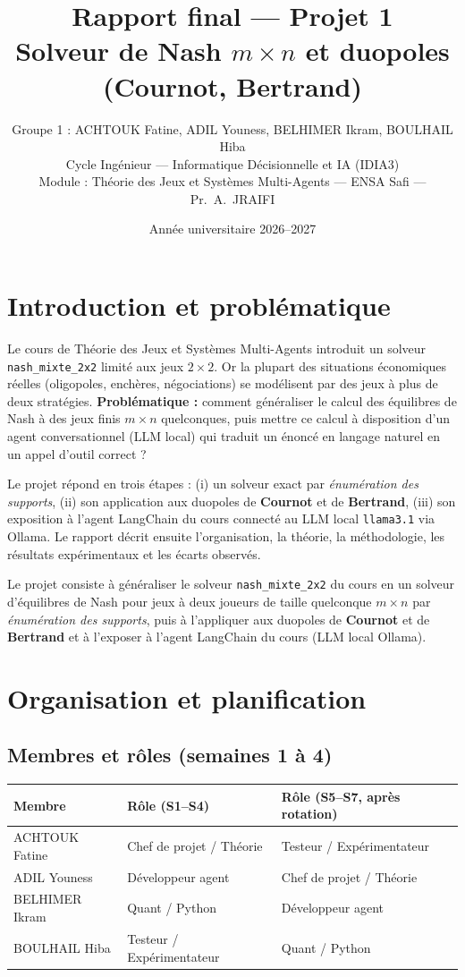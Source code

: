 \documentclass[11pt,a4paper]{article}
\title{\textbf{Rapport final — Projet 1}\\[4pt]
\large Solveur de Nash $m\times n$ et duopoles (Cournot, Bertrand)}
\author{Groupe 1 : ACHTOUK Fatine, ADIL Youness, BELHIMER Ikram, BOULHAIL Hiba\\
\small Cycle Ingénieur — Informatique Décisionnelle et IA (IDIA3)\\
\small Module : Théorie des Jeux et Systèmes Multi-Agents — ENSA Safi — Pr.\ A.\ JRAIFI}
\date{Année universitaire 2026--2027}
\begin{document}
\maketitle
\tableofcontents
\newpage

\section{Introduction et problématique}
Le cours de Théorie des Jeux et Systèmes Multi-Agents introduit un solveur
\texttt{nash\_mixte\_2x2} limité aux jeux $2\times2$. Or la plupart des situations
économiques réelles (oligopoles, enchères, négociations) se modélisent par des jeux à
plus de deux stratégies. \textbf{Problématique :} comment généraliser le calcul des
équilibres de Nash à des jeux finis $m\times n$ quelconques, puis mettre ce calcul à
disposition d'un agent conversationnel (LLM local) qui traduit un énoncé en langage
naturel en un appel d'outil correct ?

Le projet répond en trois étapes : (i) un solveur exact par \emph{énumération des supports},
(ii) son application aux duopoles de \textbf{Cournot} et de \textbf{Bertrand}, (iii) son
exposition à l'agent LangChain du cours connecté au LLM local \texttt{llama3.1} via Ollama.
Le rapport décrit ensuite l'organisation, la théorie, la méthodologie, les résultats
expérimentaux et les écarts observés.

Le projet consiste à généraliser le solveur \texttt{nash\_mixte\_2x2} du cours en un solveur
d'équilibres de Nash pour jeux à deux joueurs de taille quelconque $m\times n$ par
\emph{énumération des supports}, puis à l'appliquer aux duopoles de \textbf{Cournot} et de
\textbf{Bertrand} et à l'exposer à l'agent LangChain du cours (LLM local Ollama).

\section{Organisation et planification}
\subsection{Membres et rôles (semaines 1 à 4)}
\begin{center}
\begin{tabular}{lll}
\toprule
Membre & Rôle (S1--S4) & Rôle (S5--S7, après rotation) \\
\midrule
ACHTOUK Fatine & Chef de projet / Théorie & Testeur / Expérimentateur \\
ADIL Youness & Développeur agent & Chef de projet / Théorie \\
BELHIMER Ikram & Quant / Python & Développeur agent \\
BOULHAIL Hiba & Testeur / Expérimentateur & Quant / Python \\
\bottomrule
\end{tabular}
\end{center}
\end{document}
